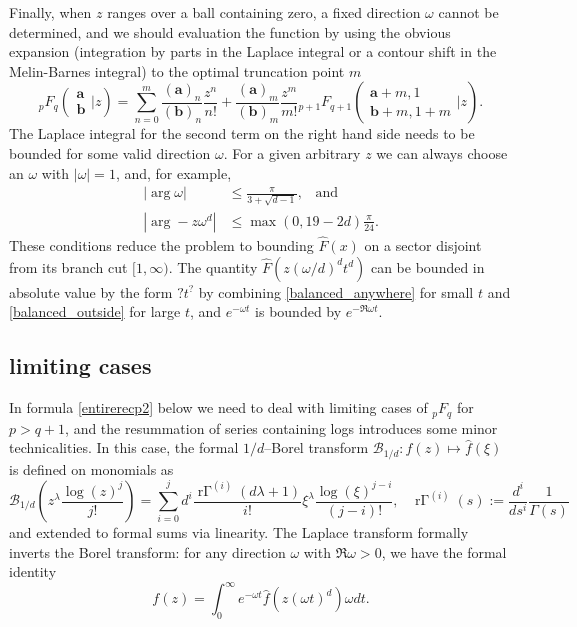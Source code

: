 \documentclass[12pt]{article}
\newcommand{\ee}[0] {e}
\numberwithin{equation}{section}
\newcommand{\FF}[6] {{}_{#1}{#2}_{#3} \left( \begin{array}{c} #4 \\ #5 \end{array} \Big| #6  \right)}
\begin{document}
Finally, when $z$ ranges over a ball containing zero, a fixed direction $\omega$ cannot be determined, and we should evaluation the function by using the obvious expansion (integration by parts in the Laplace integral or a contour shift in the Melin-Barnes integral) to the optimal truncation point $m$
\begin{equation*}
\FF{p}{F}{q}{\mathbf{a}}{\mathbf{b}}{z} = \sum_{n=0}^{m} \frac{(\mathbf{a})_n}{(\mathbf{b})_n} \frac{z^n}{n!} + \frac{(\mathbf{a})_m}{(\mathbf{b})_m} \frac{z^m}{m!} \FF{p+1}{F}{q+1}{\mathbf{a}+m,1}{\mathbf{b}+m,1+m}{z}\text{.}
\end{equation*}
The Laplace integral for the second term on the right hand side needs to be bounded for some valid direction $\omega$. For a given arbitrary $z$ we can always choose an $\omega$ with $|\omega|=1$, and, for example,
\begin{align*}
|\arg \omega| &\le \frac{\pi}{3+\sqrt{d-1}}\text{,} \quad \text{and}\\
|\arg -z \omega^d| &\le \max(0, 19 - 2d)\frac{\pi}{24}\text{.}
\end{align*}
These conditions reduce the problem to bounding $\hat{F}(x)$ on a sector disjoint from its branch cut $[1, \infty)$. The quantity $\hat{F}(z (\omega/d)^d t^d)$ can be bounded in absolute value by the form $? t^?$ by combining \eqref{balanced_anywhere} for small $t$ and \eqref{balanced_outside} for large $t$, and $\ee^{-\omega t}$ is bounded by $\ee^{- \Re \omega t}$.

\subsection{limiting cases}
In formula \eqref{entirerecp2} below we need to deal with limiting cases of ${}_p F_q$ for $p > q+1$, and the resummation of series containing logs introduces some minor technicalities. In this case, the formal $1/d$--Borel transform $\mathcal{B}_{1/d}: f(z) \mapsto \hat{f}(\xi)$ is defined on monomials as
\begin{equation*}
\mathcal{B}_{1/d} \left(z^\lambda \frac{\log(z)^j}{j!} \right) = \sum_{i=0}^{j} d^{i}\frac{{\operatorname{r\Gamma}}^{(i)}(d\lambda+1)}{i!} {\xi}^{\lambda}\frac{\log(\xi)^{j-i}}{(j-i)!}\text{,} \quad \operatorname{r\Gamma}^{(i)}(s):=\frac{d^i}{ds^i}\frac{1}{\Gamma(s)}
\end{equation*}
and extended to formal sums via linearity. The Laplace transform formally inverts the Borel transform: for any direction $\omega$ with $\Re \omega > 0$, we have the formal identity
\begin{equation*}
f(z) = \int_{0}^{\infty} \ee^{-\omega t} \hat{f}(z (\omega t)^d) \omega dt\text{.}
\end{equation*}
\end{document}
